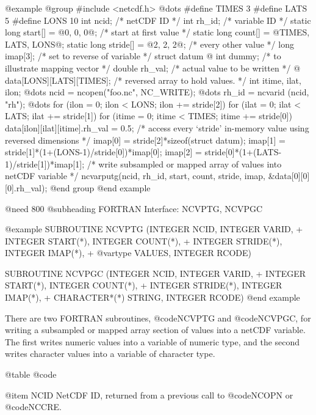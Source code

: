 @example
@group
#include <netcdf.h>
   @dots{}
#define TIMES 3
#define LATS  5
#define LONS  10
int  ncid;                         /* netCDF ID */
int  rh_id;                        /* variable ID */
static long start[] = @{0, 0, 0@};   /* start at first value */
static long count[] = @{TIMES, LATS, LONS@};
static long stride[] = @{2, 2, 2@};  /* every other value */
long imap[3];                      /* set to reverse of variable */
struct datum @{
    int    dummy;                  /* to illustrate mapping vector */
    double rh_val;                 /* actual value to be written */
@}      data[LONS][LATS][TIMES];    /* reversed array to hold values. */
int itime, ilat, ilon;
   @dots{}
ncid = ncopen("foo.nc", NC_WRITE);
   @dots{}
rh_id = ncvarid (ncid, "rh");
   @dots{}
for (ilon = 0; ilon < LONS; ilon += stride[2])
    for (ilat = 0; ilat < LATS; ilat += stride[1])
        for (itime = 0; itime < TIMES; itime += stride[0])
            data[ilon][ilat][itime].rh_val = 0.5;
/* access every `stride' in-memory value using reversed dimensions */
imap[0] = stride[2]*sizeof(struct datum);
imap[1] = stride[1]*(1+(LONS-1)/stride[0])*imap[0];
imap[2] = stride[0]*(1+(LATS-1)/stride[1])*imap[1];
/* write subsampled or mapped array of values into netCDF variable */
ncvarputg(ncid, rh_id, start, count, stride, imap, &data[0][0][0].rh_val);
@end group
@end example

@need 800
@subheading FORTRAN Interface:  NCVPTG, NCVPGC

@example
      SUBROUTINE NCVPTG (INTEGER NCID, INTEGER VARID,
     +                   INTEGER START(*), INTEGER COUNT(*),
     +                   INTEGER STRIDE(*), INTEGER IMAP(*),
     +                   @var{type} VALUES, INTEGER RCODE)

      SUBROUTINE NCVPGC (INTEGER NCID, INTEGER VARID,
     +                   INTEGER START(*), INTEGER COUNT(*),
     +                   INTEGER STRIDE(*), INTEGER IMAP(*),
     +                   CHARACTER*(*) STRING, INTEGER RCODE)
@end example

There are two FORTRAN subroutines, @code{NCVPTG} and @code{NCVPGC}, for
writing a subsampled or mapped array section of values into a netCDF variable.
The first writes
numeric values into a variable of numeric type, and the second
writes character values into a variable of character type.

@table @code

@item NCID
NetCDF ID, returned from a previous call to @code{NCOPN} or @code{NCCRE}.

